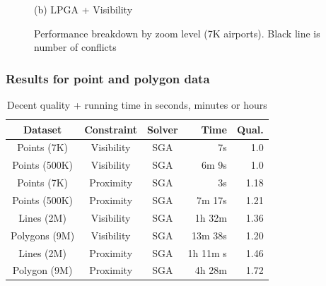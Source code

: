 \documentclass{beamer}
\begin{document}
{\begin{figure}[tb]
\begin{minipage}{0.45\linewidth}
    \centerline{(b) LPGA + Visibility}
  \end{minipage}
  \caption{Performance breakdown by zoom level (7K airports). Black line is number of conflicts}
  \label{fig:performance:breakdown}
  \vspace{-2ex}
\end{figure}

	
	
}

\frame
{
	\frametitle{Results for point and polygon data}
\begin{table}[htdp]
\vspace{-2ex}
\begin{center}
\begin{tabular}{|c|c|c|r|r|}
\hline
\textbf{Dataset} & \textbf{Constraint} & \textbf{Solver} & \textbf{Time} & \textbf{Qual.}\\ 
\hline
Points (7K)  & Visibility & SGA & 7s & 1.0 \\
Points (500K) & Visibility & SGA & 6m 9s & 1.0 \\
Points (7K)  & Proximity  & SGA & 3s & 1.18 \\
Points (500K) & Proximity & SGA & 7m 17s & 1.21 \\
\hline
Lines (2M) & Visibility & SGA & 1h 32m & 1.36 \\
Polygons (9M) & Visibility & SGA & 13m 38s & 1.20 \\
Lines (2M)  & Proximity  & SGA& 1h 11m s & 1.46 \\
Polygon (9M) & Proximity & SGA & 4h 28m & 1.72 \\
\hline
\end{tabular}
\end{center}
\caption{Decent quality + running time in seconds, minutes or hours}
\label{tab:complex:overview}
\vspace{-6ex}
\end{table}%


}
\end{document}
